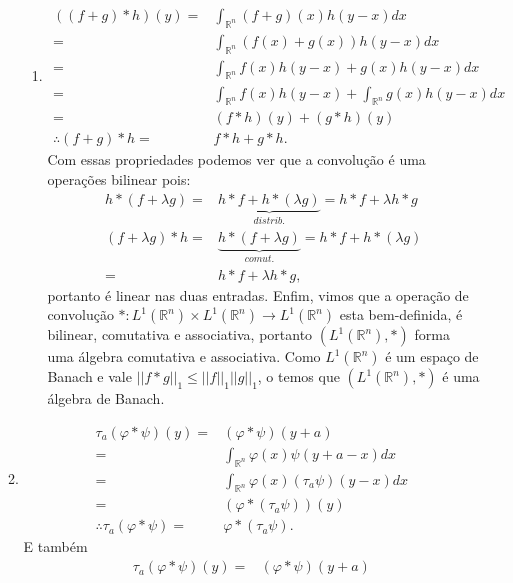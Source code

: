 \documentclass{article}
\begin{document}
\begin{enumerate}
\begin{enumerate}
\begin{enumerate}
							\item
							$$
							\begin{aligned}
							((f+g)*h)(y) = & \int_{\mathbb{R}^{n}}(f+g)(x)h(y-x)dx 
							\\
							= & \int_{\mathbb{R}^{n}}(f(x)+g(x))h(y-x)dx
							\\
							= & \int_{\mathbb{R}^{n}}f(x)h(y-x) + g(x)h(y-x)dx
							\\
							= & \int_{\mathbb{R}^{n}}f(x)h(y-x) + \int_{\mathbb{R}^{n}}g(x)h(y-x)dx
							\\
							= & (f*h)(y) + (g*h)(y)
							\\
							\therefore (f+g)*h = & f*h + g*h.
							\end{aligned}
							$$
					Com essas propriedades podemos ver que a convolução é uma operações bilinear pois:
					$$
					\begin{aligned}
					h*(f + \lambda g ) = & \underbrace{ h*f + h *(\lambda g) }_{distrib.} = h*f + \lambda h*g
					\\
					(f + \lambda g ) * h = & \underbrace{ h*(f + \lambda g ) }_{comut.} =h*f + h *(\lambda g) 
					\\
					= & h*f + \lambda h*g,
					\end{aligned}
					$$
					portanto é linear nas duas entradas. Enfim, vimos que a operação de convolução $* : L^{1}(\mathbb{R}^{n}) \times L^{1}(\mathbb{R}^{n}) \to L^{1}(\mathbb{R}^{n})$ esta bem-definida, é bilinear, comutativa e associativa, portanto $(L^{1}(\mathbb{R}^{n}), *)$ forma uma álgebra comutativa e associativa. Como $L^{1}(\mathbb{R}^{n})$  é um espaço de Banach e vale $||f*g||_{1} \leq ||f||_{1}||g||_{1}$, o temos que $(L^{1}(\mathbb{R}^{n}), *)$ é uma álgebra de Banach.
					\end{enumerate}
				\item 
				$$
				\begin{aligned}
				\tau_{a}(\varphi*\psi)(y)= & (\varphi*\psi)(y+a) 
				\\
				= & \int_{\mathbb{R}^{n}}\varphi(x)\psi(y+a-x)dx
				\\
				= & \int_{\mathbb{R}^{n}}\varphi(x)(\tau_{a}\psi)(y-x)dx
				\\
				= & (\varphi*(\tau_{a}\psi))(y)
				\\
				\therefore \tau_{a}(\varphi*\psi) = & \varphi*(\tau_{a}\psi).
				\end{aligned}
				$$
				E também
				$$
				\begin{aligned}
				\tau_{a}(\varphi*\psi)(y)= & (\varphi*\psi)(y+a) 

\end{aligned}$$
\end{enumerate}
\end{enumerate}
\end{document}
